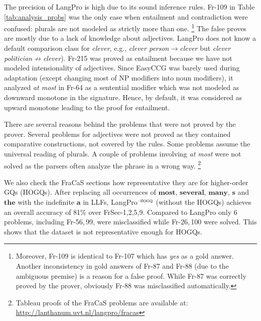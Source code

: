 \documentclass[11pt]{article}
\newcommand{\easyccg}{EasyCCG}
\newcommand{\synt}[1]{\textbf{#1}}
\begin{document}
The precision of LangPro is high due to its sound inference rules.
Fr-109 in Table\,\ref{tab:analysis_probs} was the only case when entailment and contradiction were confused: plurals are not modeled as strictly more than one.%
%
\footnote{Moreover, Fr-109 is identical to Fr-107 which has {\em yes} as a gold answer.
Another inconsistency in gold answers of Fr-87 and Fr-88 (due to the ambiguous premise) is a reason for a false proof.
While Fr-87 was correctly proved by the prover, obviously Fr-88 was misclassified automatically.
}
The false proves are mostly due to a lack of knowledge about adjectives. 
LangPro does not know a default comparison class for {\em clever}, e.g., {\em clever person}$\to${\em clever} but {\em clever politician}$\not\to${\em clever}).
Fr-215 was proved as entailment because we have not modeled intensionality of adjectives. 
Since \easyccg{} was barely used during adaptation (except changing most of NP modifiers into noun modifiers), it analyzed {\em at most} in Fr-64 as a sentential modifier which was not modeled as downward monotone in the signature.
Hence, by default, it was considered as upward monotone leading to the proof for entailment.   






There are several reasons behind the problems that were not proved by the prover.
Several problems for adjectives were not proved as they contained comparative constructions, not covered by the rules.
Some problems assume the universal reading of plurals.
A couple of problems involving {\em at most} were not solved as the parsers often analyze the phrase in a wrong way.%
% 
\footnote{Tableau proofs of the FraCaS problems are available at: \url{http://lanthanum.uvt.nl/langpro/fracas}
} 

We also check the FraCaS sections how representative they are for higher-order GQs (HOGQs).
After replacing all occurrences of $\synt{most}$, $\synt{several}$, $\synt{many}$, $\synt{s}$ and $\synt{the}$ with the indefinite $\synt{a}$ in LLFs, LangPro$^{\textsc{--hogq}}$ (without the HOGQs) achieves an overall accuracy of 81\% over FrSec-1,2,5,9.
Compared to LangPro only 6 problems, including Fr-56,\,99, were misclassified while Fr-26,\,100 were solved. 
This shows that the dataset is not representative enough for HOGQs. 
\end{document}
